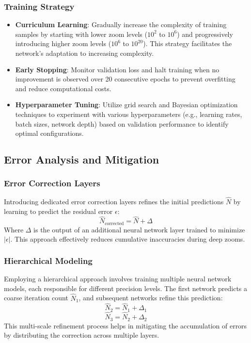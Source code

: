\documentclass[journal]{IEEEaccess}
\begin{document}
\subsubsection{Training Strategy}
\begin{itemize}
    \item \textbf{Curriculum Learning}: Gradually increase the complexity of training samples by starting with lower zoom levels (\(10^2\) to \(10^6\)) and progressively introducing higher zoom levels (\(10^6\) to \(10^{20}\)). This strategy facilitates the network's adaptation to increasing complexity.
    
    \item \textbf{Early Stopping}: Monitor validation loss and halt training when no improvement is observed over 20 consecutive epochs to prevent overfitting and reduce computational costs.
    
    \item \textbf{Hyperparameter Tuning}: Utilize grid search and Bayesian optimization techniques to experiment with various hyperparameters (e.g., learning rates, batch sizes, network depth) based on validation performance to identify optimal configurations.
\end{itemize}

\subsection{Error Analysis and Mitigation}
\subsubsection{Error Correction Layers}
Introducing dedicated error correction layers refines the initial predictions \( \hat{N} \) by learning to predict the residual error \( \epsilon \):
\[
\hat{N}_{\text{corrected}} = \hat{N} + \Delta
\]
Where \( \Delta \) is the output of an additional neural network layer trained to minimize \( |\epsilon| \). This approach effectively reduces cumulative inaccuracies during deep zooms.

\subsubsection{Hierarchical Modeling}
Employing a hierarchical approach involves training multiple neural network models, each responsible for different precision levels. The first network predicts a coarse iteration count \( \hat{N}_1 \), and subsequent networks refine this prediction:
\[
\hat{N}_2 = \hat{N}_1 + \Delta_1
\]
\[
\hat{N}_3 = \hat{N}_2 + \Delta_2
\]
This multi-scale refinement process helps in mitigating the accumulation of errors by distributing the correction across multiple layers.
\end{document}
